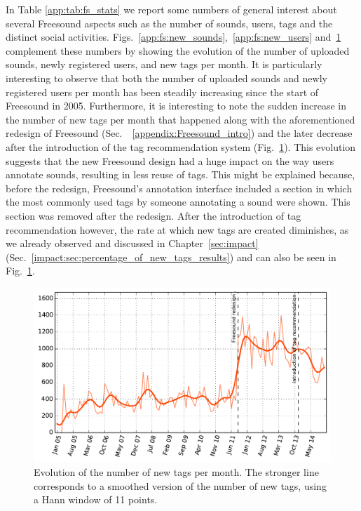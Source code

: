 In Table \ref{app:tab:fs_stats} we report some numbers of general interest about several Freesound aspects such as the number of sounds, users, tags and the distinct social activities.
Figs.~\ref{app:fs:new_sounds},~\ref{app:fs:new_users} and~\ref{app:fs:new_tags} complement these numbers by showing the evolution of the number of uploaded sounds, newly registered users, and new tags per month.
It is particularly interesting to observe that both the number of uploaded sounds and newly registered users per month has been steadily increasing since the start of Freesound in 2005.
Furthermore, it is interesting to note the sudden increase in the number of new tags per month that happened along with the aforementioned redesign of Freesound (Sec.~~\ref{appendix:Freesound_intro}) and the later decrease after the introduction of the tag recommendation system (Fig.~\ref{app:fs:new_tags}).
This evolution suggests that the new Freesound design had a huge impact on the way users annotate sounds, resulting in less reuse of tags. This might be explained because, before the redesign, Freesound's annotation interface included a section in which the most commonly used tags by someone annotating a sound were shown. This section was removed after the redesign.
After the introduction of tag recommendation however, the rate at which new tags are created diminishes, as we already observed and discussed in Chapter~\ref{sec:impact} (Sec.~\ref{impact:sec:percentage_of_new_tags_results}) and can also be seen in Fig.~\ref{app:fs:new_tags}.


\begin{figure}
\centerline{\includegraphics[width=1.0\columnwidth]{ch99/pics/Number_of_new_tags}}
\caption[Evolution of the number of new tags]{Evolution of the number of new tags per month. The stronger line corresponds to a smoothed version of the number of new tags, using a Hann window of 11 points.}
\label{app:fs:new_tags}
\end{figure}


